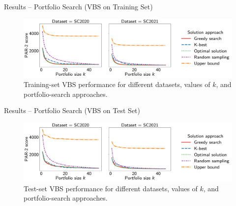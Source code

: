 \documentclass[en]{sdqbeamer}
\begin{document}
\begin{frame}[t]{Results -- Portfolio Search (VBS on Training Set)}
	\begin{figure}[htb]
		\centering
		\includegraphics[width=\textwidth]{plots/search-train-objective.pdf}
		\caption*{Training-set VBS performance for different datasets, values of $k$, and portfolio-search approaches.}
	\end{figure}
\end{frame}

\begin{frame}[t]{Results -- Portfolio Search (VBS on Test Set)}
	\begin{figure}[htb]
		\centering
		\includegraphics[width=\textwidth]{plots/search-test-objective.pdf}
		\caption*{Test-set VBS performance for different datasets, values of $k$, and portfolio-search approaches.}
	\end{figure}
\end{frame}
\end{document}
